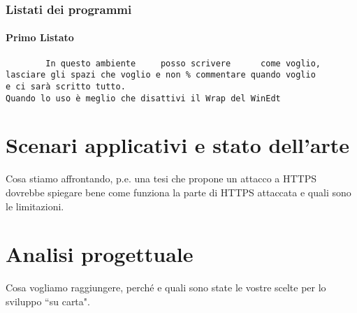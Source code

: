 \documentclass[12pt,a4paper,openright,twoside]{report}
\begin{document}
\subsection{Listati dei programmi}
\subsubsection{Primo Listato}
\begin{verbatim}
        In questo ambiente     posso scrivere      come voglio,
lasciare gli spazi che voglio e non % commentare quando voglio
e ci sarà scritto tutto.
Quando lo uso è meglio che disattivi il Wrap del WinEdt
\end{verbatim}
\clearpage{\pagestyle{empty}\cleardoublepage}



\chapter{Scenari applicativi e stato dell'arte}
Cosa stiamo affrontando, p.e. una tesi che propone un attacco a HTTPS dovrebbe spiegare bene come funziona la parte di HTTPS attaccata e quali sono le limitazioni.

\clearpage{\pagestyle{empty}\cleardoublepage}



\chapter{Analisi progettuale}
Cosa vogliamo raggiungere, perch\'e e quali sono state le vostre scelte per lo sviluppo ``su carta".


\clearpage{\pagestyle{empty}\cleardoublepage}



\end{document}
